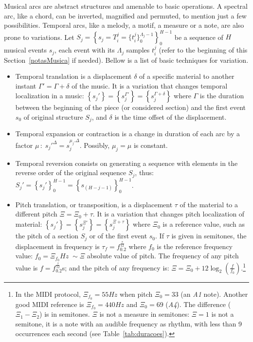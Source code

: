 Musical arcs are abstract structures and amenable to basic operations. A spectral arc, like a chord, can be inverted, magnified and permuted, to mention just a few possibilities. Temporal arcs, like a melody, a motif, a measure or a note, are also
prone to variations. Let
$S_j=\left\{s_j=T_i^j=\{t_i^{j}\}_0^{\Lambda_j-1}\right\}_0^{H-1}$ be a sequence
of $H$ musical events $s_j$, each event with its $\Lambda_j$ samples $t_i^j$
(refer to the beginning of this Section~\ref{notasMusica} if needed). Bellow is a list of basic techniques
for variation.
\begin{itemize}
        \item Temporal translation is a displacement
    $\delta$ of a specific material to another instant $\Gamma'=\Gamma + \delta$
    of the music. It is a variation that changes temporal localization in
    a music:
    $\left\{s_j'\right\}=\left\{s_j^{\Gamma'}\right\}=\left\{s_j^{\Gamma+\delta}\right\}$
    where $\Gamma$ is the duration between the beginning of the piece (or considered
    section) and the first event $s_0$ of original structure $S_j$, and
    $\delta$ is the time offset of the displacement.

    \item Temporal expansion or contraction is a change in duration of each
    arc by a factor $\mu\,:\; s_j'^{\Delta}=s_j^{\mu_j . \Delta}$. Possibly,
    $\mu_j=\mu$ is constant.

    \item Temporal reversion consists on generating a sequence with elements
    in the reverse order of the original sequence $S_j$, thus: $S_j'=\left\{s_j'\right\}_0^{H-1}=\left\{s_{(H-j-1)}\right\}_0^{H-1}$.

    \item Pitch translation, or transposition, is a displacement $\tau$ of the material to a
        different pitch $\Xi=\Xi_0 + \tau$. It is a variation that changes pitch
        localization of material:
        $\left\{s_j'\right\}=\left\{s_j^{\Xi'}\right\}=\left\{s_j^{\Xi+\tau}\right\}$
        where $\Xi_0$ is a reference value, such as the pitch of a section $S_j$ or of the first event $s_0$.
        If $\tau$ is given in semitones, the displacement in
        frequency is $\tau_f=f_0.2^{\frac{\tau}{12}}$ where $f_0$ is the
        reference frequency value: $f_0=\Xi_{f_0}Hz\;\sim \Xi$ absolute value of pitch. The frequency of any pitch value is $f=f_0.2^{\frac{\tau}{12}}$s; 
        and the pitch of any frequency is: $\Xi=\Xi_0 +12
		\log_2\left(\frac{f}{f_0}\right)$.\footnote{In the MIDI protocol, $\Xi_{f_0}=55Hz$ when pitch $\Xi_0=33$
	(an \textit{A1} note). Another good MIDI reference is $\Xi_{f_0}=440Hz$ and
		$\Xi_0=69$ (\textit{A4}). The difference ($\Xi_1 - \Xi_2$) is in semitones.
        $\Xi$ is not a measure in semitones: $\Xi=1$ is not a semitone, it is a note with an audible frequency as rhythm, with
		less than 9 occurrences each second (see Table~\ref{tab:duracoes}).}


\end{itemize}
